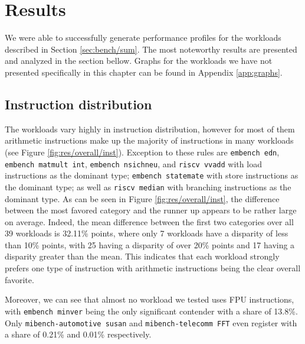 \documentclass[../bachelor_paper.tex]{subfiles}
\begin{document}
\chapter{Results}
    \label{ch:res}

We were able to successfully generate performance profiles for the workloads described in Section \ref{sec:bench/sum}. The most noteworthy results are presented and analyzed in the section bellow. Graphs for the workloads we have not presented specifically in this chapter can be found in Appendix \ref{app:graphs}.

\section{Instruction distribution}
The workloads vary highly in instruction distribution, however for most of them arithmetic instructions make up the majority of instructions in many workloads (see Figure \ref{fig:res/overall/inst}). Exception to these rules are \texttt{embench edn}, \texttt{embench matmult int}, \texttt{embench nsichneu}, and \texttt{riscv vvadd} with load instructions as the dominant type; \texttt{embench statemate} with store instructions as the dominant type; as well as \texttt{riscv median} with branching instructions as the dominant type. As can be seen in Figure \ref{fig:res/overall/inst}, the difference between the most favored category and the runner up appears to be rather large on average. Indeed, the mean difference between the first two categories over all 39 workloads is 32.11\% points, where only 7 workloads have a disparity of less than 10\% points, with 25 having a disparity of over 20\% points and 17 having a disparity greater than the mean. This indicates that each workload strongly prefers one type of instruction with arithmetic instructions being the clear overall favorite. 

Moreover, we can see that almost no workload we tested uses FPU instructions, with \texttt{embench minver} being the only significant contender with a share of 13.8\%. Only \texttt{mibench-automotive susan} and \texttt{mibench-telecomm FFT} even register with a share of 0.21\% and 0.01\% respectively.
\end{document}
